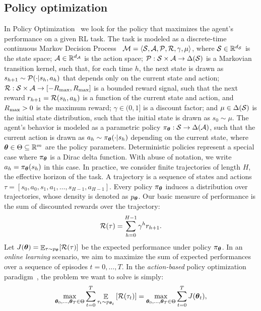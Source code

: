 \documentclass{article}
\begin{document}
\subsection{Policy optimization}
In Policy Optimization~\citep{deisenroth2013survey} we look for the policy that maximizes the agent's performance on a given RL task. The task is modeled as a discrete-time continuous Markov Decision Process~\citep[MDP,][]{puterman2014markov} $\mathcal{M} = \langle\mathcal{S},\mathcal{A},\mathcal{P},\mathcal{R},\gamma,\mu\rangle$, where $\mathcal{S}\in\mathbb{R}^{d_{\mathcal{S}}}$ is the state space; $\mathcal{A}\in\mathbb{R}^{d_{\mathcal{A}}}$ is the action space; $\mathcal{P}:\mathcal{S}\times\mathcal{A}\to\Delta(\mathcal{S})$ is a Markovian transition kernel, such that, for each time $h$, the next state is drawn as $s_{h+1}\sim\mathcal{P}(\cdot|s_h,a_h)$ that depends only on the current state and action; $\mathcal{R}:\mathcal{S}\times\mathcal{A}\to[-R_{\max},R_{\max}]$ is a bounded reward signal, such that the next reward $r_{h+1} = \mathcal{R}(s_h,a_h)$ is a function of the current state and action, and $R_{\max}>0$ is the maximum reward; $\gamma\in(0,1]$ is a discount factor; and $\mu\in\Delta(\mathcal{S})$ is the initial state distribution, such that the initial state is drawn as $s_0\sim\mu$. The agent's behavior is modeled as a parametric policy $\pi_{\boldsymbol{\theta}}:\mathcal{S}\to\Delta(\mathcal{A})$, such that the current action is drawn as $a_h\sim\pi_{\boldsymbol{\theta}}(\cdot|s_h)$ depending on the current state, where $\boldsymbol{\theta}\in\Theta\subseteq\mathbb{R}^m$ are the policy parameters. Deterministic policies represent a special case where $\pi_{\boldsymbol{\theta}}$ is a Dirac delta function. With abuse of notation, we write $a_h=\pi_{\boldsymbol{\theta}}(s_h)$ in this case. In practice, we consider finite trajectories of length $H$, the effective horizon of the task.
A trajectory is a sequence of states and actions $\tau=[s_0,a_0,s_1,a_1,\dots,s_{H-1},a_{H-1}]$. Every policy $\pi_{\boldsymbol{\theta}}$ induces a distribution over trajectories, whose density is denoted as $p_{\boldsymbol{\theta}}$. Our basic measure of performance is the sum of discounted rewards over the trajectory:
\begin{align}\label{eq:Rtau}
	\mathcal{R}(\tau) = \sum_{h=0}^{H-1}\gamma^hr_{h+1}.
\end{align}
Let $J(\boldsymbol{\theta}) = \mathop{\mathbb{E}}_{\tau\sim p_{\boldsymbol{\theta}}}[\mathcal{R}(\tau)]$ be the expected performance under policy $\pi_{\boldsymbol{\theta}}$. In an \textit{online learning} scenario, we aim to maximize the sum of expected performances over a sequence of episodes $t=0,\dots,T$. 
In the \textit{action-based} policy optimization paradigm~\citep{peters2008reinforcement}, the problem we want to solve is simply:
\begin{align}\label{eq:Jtheta}
	\max_{\boldsymbol{\theta}_0,\dots,\boldsymbol{\theta}_T\in\Theta} \sum_{t=0}^T \mathop{\mathbb{E}}_{\tau_t\sim p_{\boldsymbol{\theta}_t}}\left[\mathcal{R}(\tau_t)\right] = 
	\max_{\boldsymbol{\theta}_0,\dots,\boldsymbol{\theta}_T\in\Theta} \sum_{t=0}^TJ(\boldsymbol{\theta}_t),
\end{align}
\end{document}
